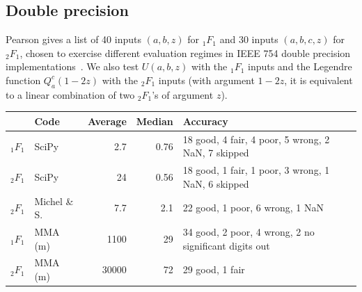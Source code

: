 \documentclass[11pt,a4paper]{article}
\begin{document}
\subsection{Double precision}

Pearson gives a list of 40 inputs $(a,b,z)$ for ${}_1F_1$
and 30 inputs $(a,b,c,z)$ for ${}_2F_1$, chosen to exercise different
evaluation regimes in IEEE 754 double precision
implementations~\cite{pearson2009computation,pearson2014numerical}.
We also test $U(a,b,z)$ with the ${}_1F_1$ inputs
and the Legendre function $Q_a^c(1-2z)$
with the ${}_2F_1$ inputs (with argument $1-2z$, it is equivalent to a linear
combination of two ${}_2F_1$'s of argument $z$).

\begin{table}
\renewcommand{\arraystretch}{1.4}
\setlength{\tabcolsep}{.4em}
\begin{center}
\begin{scriptsize}
\begin{tabular}{l l | r r | l}
          & Code & Average & Median   & Accuracy \\
\hline
${}_1F_1$ & SciPy         & 2.7 & 0.76         & 18 good, 4 fair, 4 poor, 5 wrong, 2 NaN, 7 skipped\\
${}_2F_1$ & SciPy         & 24   & 0.56        & 18 good, 1 fair, 1 poor, 3 wrong, 1 NaN, 6 skipped \\
\hline
${}_2F_1$ & Michel \& S.  & 7.7  & 2.1 & 22 good, 1 poor, 6 wrong, 1 NaN \\
\hline
${}_1F_1$ & MMA (m)       & 1100      &     29 & 34 good, 2 poor, 4 wrong, 2 no significant digits out \\
${}_2F_1$ & MMA (m)       & 30000     &     72   & 29 good, 1 fair \\


\end{tabular}
\end{scriptsize}
\end{center}
\end{table}
\end{document}
